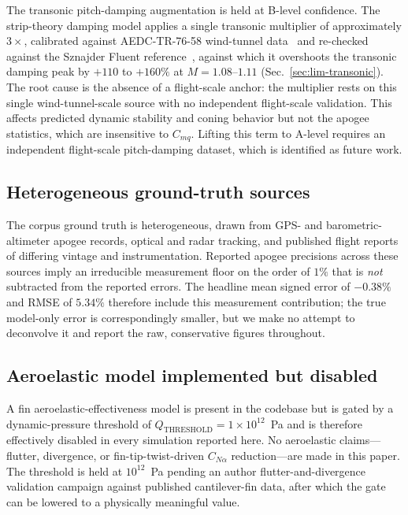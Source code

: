 The transonic pitch-damping augmentation is held at B-level confidence. The
strip-theory damping model applies a single transonic multiplier of
approximately $3\times$, calibrated against AEDC-TR-76-58 wind-tunnel
data~\cite{aedc7658} and re-checked against the Sznajder Fluent
reference~\cite{sznajder2025}, against which it overshoots the transonic damping
peak by $+110$ to $+160\%$ at $M = 1.08$--$1.11$ (Sec.~\ref{sec:lim-transonic}).
The root cause is the absence of a flight-scale anchor: the multiplier rests on
this single wind-tunnel-scale source with no independent flight-scale validation.
This affects predicted dynamic stability and coning behavior but not the apogee
statistics, which are insensitive to $C_{mq}$. Lifting this term to A-level
requires an independent flight-scale pitch-damping dataset, which is identified
as future work.

\subsection{Heterogeneous ground-truth sources}
\label{sec:lim-truth}

The corpus ground truth is heterogeneous, drawn from GPS- and barometric-altimeter
apogee records, optical and radar tracking, and published flight reports of
differing vintage and instrumentation. Reported apogee precisions across these
sources imply an irreducible measurement floor on the order of $1\%$ that is
\emph{not} subtracted from the reported errors. The headline mean signed error
of $-0.38\%$ and RMSE of $5.34\%$ therefore include this measurement
contribution; the true model-only error is correspondingly smaller, but we make
no attempt to deconvolve it and report the raw, conservative figures throughout.

\subsection{Aeroelastic model implemented but disabled}
\label{sec:lim-aeroelastic}

A fin aeroelastic-effectiveness model is present in the codebase but is gated by
a dynamic-pressure threshold of $Q_{\mathrm{THRESHOLD}} = 1 \times 10^{12}$~Pa
and is therefore effectively disabled in every simulation reported here. No
aeroelastic claims---flutter, divergence, or fin-tip-twist-driven $C_{N\alpha}$
reduction---are made in this paper. The threshold is held at $10^{12}$~Pa
pending an author flutter-and-divergence validation campaign against published
cantilever-fin data, after which the gate can be lowered to a physically
meaningful value.

